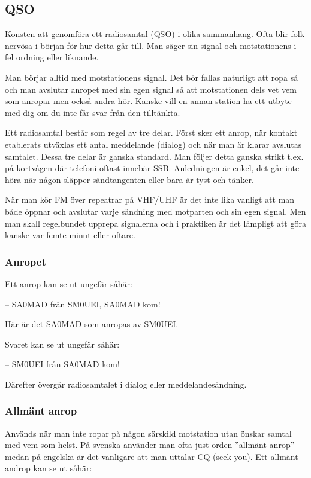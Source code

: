 \subsection{QSO}

Konsten att genomföra ett radiosamtal (QSO) i olika sammanhang. Ofta
blir folk nervösa i början för hur detta går till. Man säger sin
signal och motstationens i fel ordning eller liknande.

Man börjar alltid med motstationens signal. Det bör fallas naturligt
att ropa så och man avslutar anropet med sin egen signal så att
motstationen dels vet vem som anropar men också andra hör. Kanske vill
en annan station ha ett utbyte med dig om du inte får svar från den
tilltänkta.

Ett radiosamtal består som regel av tre delar. Först sker ett anrop, när kontakt etablerats utväxlas ett antal meddelande (dialog) och när man är klarar avslutas samtalet. Dessa tre delar är ganska standard. Man följer detta ganska strikt t.ex. på kortvågen där telefoni oftast innebär SSB. Anledningen är enkel, det går inte höra när någon släpper sändtangenten eller bara är tyst och tänker.

När man kör FM över repeatrar på VHF/UHF är det inte lika vanligt att man både öppnar och avslutar varje sändning med motparten och sin egen signal. Men man skall regelbundet upprepa signalerna och i praktiken är det lämpligt att göra kanske var femte minut eller oftare.

\subsubsection{Anropet}

Ett anrop kan se ut ungefär såhär:

-- SA0MAD från SM0UEI, SA0MAD kom!

Här är det SA0MAD som anropas av SM0UEI. 

Svaret kan se ut ungefär såhär:

-- SM0UEI från SA0MAD kom!

Därefter övergår radiosamtalet i dialog eller meddelandesändning.

\subsubsection{Allmänt anrop} 

Används när man inte ropar på någon särskild motstation utan önskar samtal med vem som helst. På svenska använder man ofta just orden ''allmänt anrop'' medan på engelska är det vanligare att man uttalar CQ (seek you). Ett allmänt androp kan se ut såhär:

